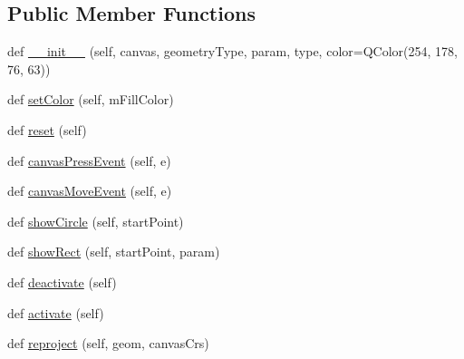 \subsection*{Public Member Functions}
\begin{DoxyCompactItemize}
\item 
def \mbox{\hyperlink{class_dsg_tools_1_1_production_tools_1_1_minimum_area_tool_1_1shape_tool_1_1_shape_tool_a0c6640cab6dc85dd2b103b6c69b4d8bd}{\+\_\+\+\_\+init\+\_\+\+\_\+}} (self, canvas, geometry\+Type, param, type, color=Q\+Color(254, 178, 76, 63))
\item 
def \mbox{\hyperlink{class_dsg_tools_1_1_production_tools_1_1_minimum_area_tool_1_1shape_tool_1_1_shape_tool_ad5d51bbe618c8824ed4ef49cb2881865}{set\+Color}} (self, m\+Fill\+Color)
\item 
def \mbox{\hyperlink{class_dsg_tools_1_1_production_tools_1_1_minimum_area_tool_1_1shape_tool_1_1_shape_tool_a353d9b814ba5aaca64cefe209b1725b8}{reset}} (self)
\item 
def \mbox{\hyperlink{class_dsg_tools_1_1_production_tools_1_1_minimum_area_tool_1_1shape_tool_1_1_shape_tool_a8124861665a6f6a5f4cd04714ad6af0a}{canvas\+Press\+Event}} (self, e)
\item 
def \mbox{\hyperlink{class_dsg_tools_1_1_production_tools_1_1_minimum_area_tool_1_1shape_tool_1_1_shape_tool_ac79a4b1b6339d1524d9bd330e0dab860}{canvas\+Move\+Event}} (self, e)
\item 
def \mbox{\hyperlink{class_dsg_tools_1_1_production_tools_1_1_minimum_area_tool_1_1shape_tool_1_1_shape_tool_a1f5cb36960ca5dfe9b2fbf08763d80f0}{show\+Circle}} (self, start\+Point)
\item 
def \mbox{\hyperlink{class_dsg_tools_1_1_production_tools_1_1_minimum_area_tool_1_1shape_tool_1_1_shape_tool_a60b9a4ad2d682db2e8ab8f10006eb12e}{show\+Rect}} (self, start\+Point, param)
\item 
def \mbox{\hyperlink{class_dsg_tools_1_1_production_tools_1_1_minimum_area_tool_1_1shape_tool_1_1_shape_tool_ae299098b8dfcf0fd7cc6fb0867a3a835}{deactivate}} (self)
\item 
def \mbox{\hyperlink{class_dsg_tools_1_1_production_tools_1_1_minimum_area_tool_1_1shape_tool_1_1_shape_tool_ad604c8af734f0d61d8fe34203c7372b7}{activate}} (self)
\item 
def \mbox{\hyperlink{class_dsg_tools_1_1_production_tools_1_1_minimum_area_tool_1_1shape_tool_1_1_shape_tool_a16d7438e15d5be7036f6da54d8318d27}{reproject}} (self, geom, canvas\+Crs)
\end{DoxyCompactItemize}
